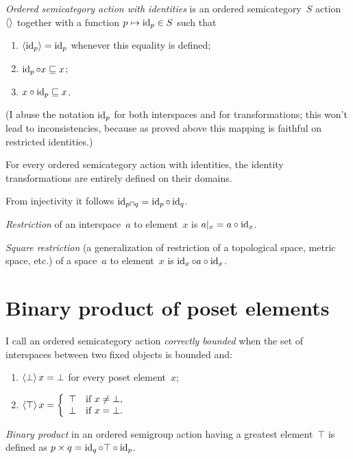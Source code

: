 \emph{Ordered semicategory action with identities} is an ordered semicategory~$S$ action~$\left\langle \right\rangle$ together with a function $p\mapsto\operatorname{id}_p\in S$ such that
\begin{enumerate}
\item $\left\langle \operatorname{id}_p\right\rangle=\operatorname{id}_p$ whenever this equality is defined;
\item $\operatorname{id}_p\circ x\sqsubseteq x$;
\item $x\circ\operatorname{id}_p\sqsubseteq x$.
\end{enumerate}
(I abuse the notation $\operatorname{id}_p$ for both interspaces and for transformations; this won't lead to inconsistencies, because as proved above this mapping is faithful on restricted identities.)

\begin{obvious}
For every ordered semicategory action with identities, the identity transformations are entirely defined on their domains.
\end{obvious}

From injectivity it follows $\operatorname{id}_{p\sqcap q} = \operatorname{id}_p\circ\operatorname{id}_q$.

\emph{Restriction} of an interspace~$a$ to element~$x$ is $a|_x=a\circ\operatorname{id}_x$.

\emph{Square restriction} (a generalization of restriction of a topological space, metric space, etc.) of a space~$a$ to element~$x$ is $\operatorname{id}_x\circ a\circ\operatorname{id}_x$.

\chapter{Binary product of poset elements}

\begin{defn}
I call an ordered semicategory action \emph{correctly bounded} when the set of interspaces between two fixed objects is bounded and:
\begin{enumerate}
\item $\left\langle \bot\right\rangle x = \bot$ for every poset element~$x$;
\item $\left\langle \top\right\rangle x =
\left\{\begin{array}{ll}\top&\text{if }x\ne\bot,\\\bot&\text{if }x=\bot.\end{array}\right.$
\end{enumerate}
\end{defn}

\emph{Binary product} in an ordered semigroup action having a greatest element~$\top$ is defined as $p\times q=\operatorname{id}_q\circ\top\circ\operatorname{id}_p$.

